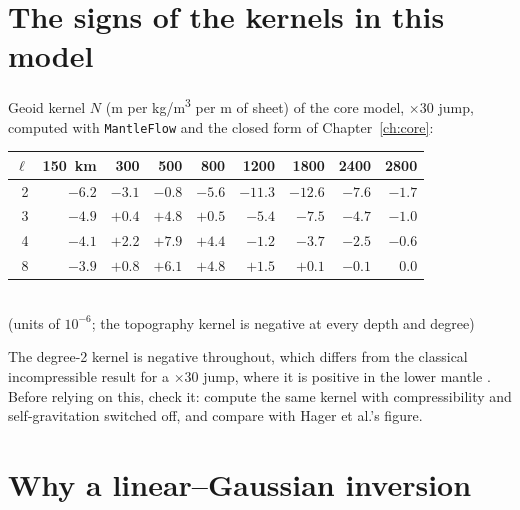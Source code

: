 \section{The signs of the kernels in this model}
\label{sec:kernel-signs}
Geoid kernel $N$ (\si{m} per \si{kg/m^3} per \si{m} of sheet) of the core model, $\times30$ jump, computed with \texttt{MantleFlow} and the closed form of Chapter~\ref{ch:core}:
\begin{center}
\small
\begin{tabular}{rrrrrrrrr}
\toprule
$\ell$ & \qty{150}{km} & 300 & 500 & 800 & 1200 & 1800 & 2400 & 2800\\
\midrule
2 & $-6.2$ & $-3.1$ & $-0.8$ & $-5.6$ & $-11.3$ & $-12.6$ & $-7.6$ & $-1.7$\\
3 & $-4.9$ & $+0.4$ & $+4.8$ & $+0.5$ & $-5.4$ & $-7.5$ & $-4.7$ & $-1.0$\\
4 & $-4.1$ & $+2.2$ & $+7.9$ & $+4.4$ & $-1.2$ & $-3.7$ & $-2.5$ & $-0.6$\\
8 & $-3.9$ & $+0.8$ & $+6.1$ & $+4.8$ & $+1.5$ & $+0.1$ & $-0.1$ & $0.0$\\
\bottomrule
\end{tabular}
\\[0.3em] (units of $10^{-6}$; the topography kernel is negative at every depth and degree)
\end{center}
The degree-2 kernel is negative throughout, which differs from the classical incompressible result for a $\times30$ jump, where it is positive in the lower mantle \citep{hager_lower_1985}.
Before relying on this, check it: compute the same kernel with compressibility and self-gravitation switched off, and compare with Hager et al.'s figure.

\section{Why a linear--Gaussian inversion}

